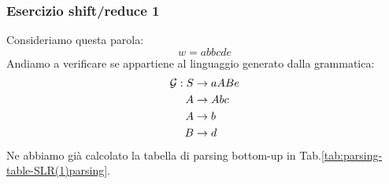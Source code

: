 \documentclass[class=book, crop=false, oneside, 12pt]{standalone}
\begin{document}
\subsubsection{Esercizio shift/reduce 1}
Consideriamo questa parola:
\begin{equation*}
    w = abbcde
\end{equation*}
Andiamo a verificare se appartiene al linguaggio generato dalla grammatica:
\begin{align}
    \label{eq:grammar-ex-sh/re-1}
    \mathcal{G}: S &\to aABe \\
    A &\to Abc \nonumber \\ \notag
    A &\to b \nonumber \\ \notag
    B &\to d  \nonumber \notag
\end{align}
Ne abbiamo già calcolato la tabella di parsing bottom-up in Tab.\ref{tab:parsing-table-SLR(1)parsing}.
\end{document}
